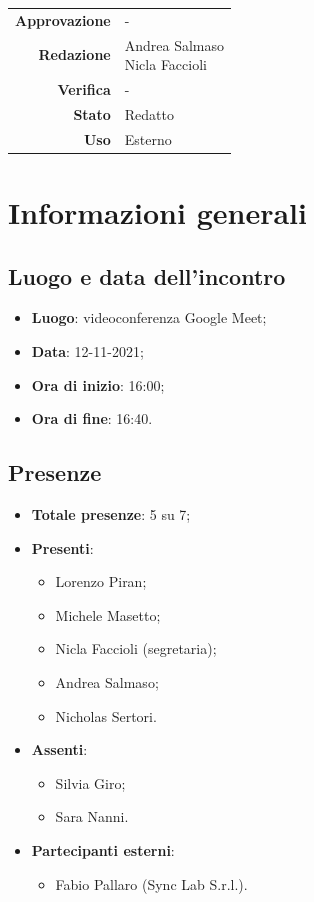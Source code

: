 \documentclass[11pt]{article}
\begin{document}
\begin{titlepage}
\begin{center}
			
			\vfill
			
			
			\begin{tabular}{r|l}
				\textbf{Approvazione} &  -\\
				\textbf{Redazione} &  \parbox[t]{5cm}{Andrea Salmaso \\Nicla Faccioli}\\
				\textbf{Verifica} &  -\\
				\textbf{Stato} & Redatto \\
				\textbf{Uso} & Esterno
			\end{tabular}
			\vfill
			
		\end{center}
	\end{titlepage}
	
	\section{Informazioni generali}
		\subsection{Luogo e data dell'incontro}
			\begin{itemize}
				\item \textbf{Luogo}: videoconferenza Google Meet;
				\item \textbf{Data}: 12-11-2021;
				\item \textbf{Ora di inizio}: 16:00;
				\item \textbf{Ora di fine}: 16:40.
			\end{itemize}
		
		\subsection{Presenze}
			\begin{itemize}
				\item \textbf{Totale presenze}: 5 su 7;
				\item \textbf{Presenti}:
				\begin{itemize}
					\item Lorenzo Piran; 
					\item Michele Masetto;
					\item Nicla Faccioli (segretaria);
					\item Andrea Salmaso;
					\item Nicholas Sertori.
				\end{itemize}
				\item \textbf{Assenti}: 
					\begin{itemize}
						\item Silvia Giro;
						\item Sara Nanni.
					\end{itemize}
				\item \textbf{Partecipanti esterni}:
				\begin{itemize}
					\item Fabio Pallaro (Sync Lab S.r.l.).
				\end{itemize}
			\end{itemize}
		
\end{document}
